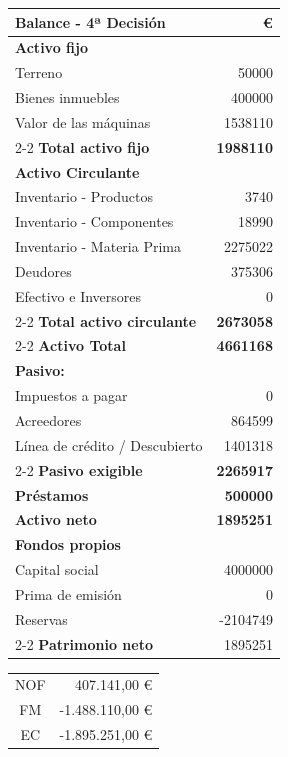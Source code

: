 \begin{table}[h]
    \centering
    \begin{tabular}{lr}
        \textbf{Balance - 4ª Decisión}               & \textbf{€} \\
        \hline
        \textbf{Activo fijo}                & \\
        Terreno                             & 50000 \\
        Bienes inmuebles                    & 400000 \\
        Valor de las máquinas               & 1538110 \\
        \cline{2-2}
        \textbf{Total activo fijo}          & \textbf{1988110} \\
        \textbf{Activo Circulante}          & \\
        Inventario - Productos              & 3740 \\
        Inventario - Componentes            & 18990 \\
        Inventario - Materia Prima          & 2275022 \\
        Deudores                            & 375306 \\
        Efectivo e Inversores               & 0 \\
        \cline{2-2}
        \textbf{Total activo circulante}    & \textbf{2673058} \\
        \cline{2-2}
        \textbf{Activo Total}               & \textbf{4661168} \\
        \textbf{Pasivo:}                    & \\
        Impuestos a pagar                   & 0 \\
        Acreedores                          & 864599 \\
        Línea de crédito / Descubierto      & 1401318 \\
        \cline{2-2}
        \textbf{Pasivo exigible}            & \textbf{2265917} \\
        \textbf{Préstamos}                  & \textbf{500000} \\
        \textbf{Activo neto}                & \textbf{1895251} \\
        \textbf{Fondos propios}             & \\
        Capital social                      & 4000000 \\
        Prima de emisión                    & 0 \\
        Reservas                            & -2104749 \\
        \cline{2-2}
        \textbf{Patrimonio neto}            & 1895251 
    \end{tabular}
\end{table}

\begin{table}[h]
    \centering
    \begin{tabular}{|c|r|}
        \hline
        NOF & 407.141,00 € \\
        FM & -1.488.110,00 € \\
        EC & -1.895.251,00 € \\
        \hline
    \end{tabular}
\end{table}